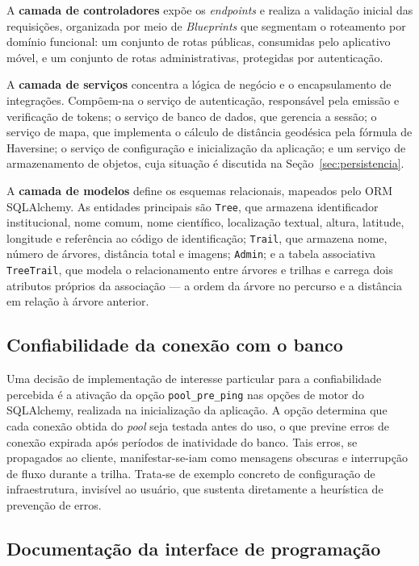 A \textbf{camada de controladores} expõe os \textit{endpoints} e realiza a
validação inicial das requisições, organizada por meio de \textit{Blueprints} que
segmentam o roteamento por domínio funcional: um conjunto de rotas públicas,
consumidas pelo aplicativo móvel, e um conjunto de rotas administrativas,
protegidas por autenticação.

A \textbf{camada de serviços} concentra a lógica de negócio e o encapsulamento de
integrações. Compõem-na o serviço de autenticação, responsável pela emissão e
verificação de tokens; o serviço de banco de dados, que gerencia a sessão; o
serviço de mapa, que implementa o cálculo de distância geodésica pela fórmula de
Haversine; o serviço de configuração e inicialização da aplicação; e um serviço de
armazenamento de objetos, cuja situação é discutida na
Seção~\ref{sec:persistencia}.

A \textbf{camada de modelos} define os esquemas relacionais, mapeados pelo ORM
SQLAlchemy. As entidades principais são \texttt{Tree}, que armazena identificador
institucional, nome comum, nome científico, localização textual, altura, latitude,
longitude e referência ao código de identificação; \texttt{Trail}, que armazena
nome, número de árvores, distância total e imagens; \texttt{Admin}; e a tabela
associativa \texttt{TreeTrail}, que modela o relacionamento entre árvores e
trilhas e carrega dois atributos próprios da associação --- a ordem da árvore no
percurso e a distância em relação à árvore anterior.

\subsection{Confiabilidade da conexão com o banco}

Uma decisão de implementação de interesse particular para a confiabilidade
percebida é a ativação da opção \texttt{pool\_pre\_ping} nas opções de motor do
SQLAlchemy, realizada na inicialização da aplicação. A opção determina que cada
conexão obtida do \textit{pool} seja testada antes do uso, o que previne erros de
conexão expirada após períodos de inatividade do banco. Tais erros, se propagados
ao cliente, manifestar-se-iam como mensagens obscuras e interrupção de fluxo
durante a trilha. Trata-se de exemplo concreto de configuração de infraestrutura,
invisível ao usuário, que sustenta diretamente a heurística de prevenção de erros.

\subsection{Documentação da interface de programação}

